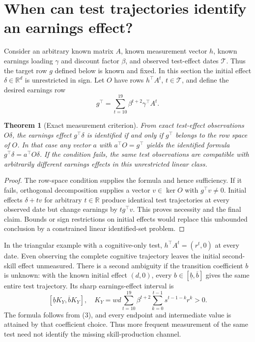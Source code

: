 \documentclass[11pt,a4paper]{article}
\newtheorem{theorem}{Theorem}[section]
\theoremstyle{remark}
\newcommand{\R}{\mathbb R}
\begin{document}
\section{When can test trajectories identify an earnings effect?}
Consider an arbitrary known matrix $A$, known measurement vector $h$, known earnings loading $\gamma$ and discount factor $\beta$, and observed test-effect dates $\mathcal T$. Thus the target row $g$ defined below is known and fixed. In this section the initial effect $\delta\in\R^d$ is unrestricted in sign. Let $O$ have rows $h^\top A^t$, $t\in\mathcal T$, and define the desired earnings row
\[
 g^\top=\sum_{t=10}^{19}\beta^{t+2}\gamma^\top A^t.
\]
\begin{theorem}[Exact measurement criterion]
From exact test-effect observations $O\delta$, the earnings effect $g^\top\delta$ is identified if and only if $g^\top$ belongs to the row space of $O$. In that case any vector $a$ with $a^\top O=g^\top$ yields the identified formula $g^\top\delta=a^\top O\delta$. If the condition fails, the same test observations are compatible with arbitrarily different earnings effects in this unrestricted linear class.
\end{theorem}
\begin{proof}
The row-space condition supplies the formula and hence sufficiency. If it fails, orthogonal decomposition supplies a vector $v\in\ker O$ with $g^\top v\ne0$. Initial effects $\delta+tv$ for arbitrary $t\in\R$ produce identical test trajectories at every observed date but change earnings by $t g^\top v$. This proves necessity and the final claim. Bounds or sign restrictions on initial effects would replace this unbounded conclusion by a constrained linear identified-set problem.
\end{proof}
In the triangular example with a cognitive-only test, $h^\top A^t=(r^t,0)$ at every date. Even observing the complete cognitive trajectory leaves the initial second-skill effect unmeasured. There is a second ambiguity if the transition coefficient $b$ is unknown: with the known initial effect $(d,0)$, every $b\in[\underline b,\overline b]$ gives the same entire test trajectory. Its sharp earnings-effect interval is
\[
 [\underline b K_Y,\overline b K_Y],\quad
 K_Y=wd\sum_{t=10}^{19}\beta^{t+2}
       \sum_{k=0}^{t-1}s^{t-1-k}r^k>0. \tag{4}
\]
The formula follows from (3), and every endpoint and intermediate value is attained by that coefficient choice. Thus more frequent measurement of the same test need not identify the missing skill-production channel.
\end{document}
